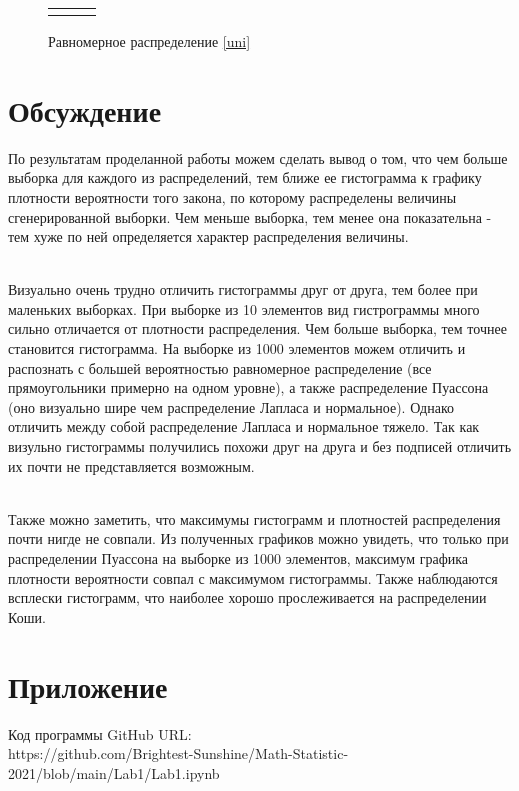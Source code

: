 \documentclass[a4paper]{article}
\begin{document}
	\begin{figure}[H]
		\centering
		\begin{tabular}{ccc}
			&
			&
		\end{tabular}
		\caption{Равномерное распределение \eqref{uni}}
		\label{fig:uniform}
	\end{figure}

\section{Обсуждение}

\noindent По результатам проделанной работы можем сделать вывод о том, что чем больше выборка для каждого из распределений, тем ближе ее гистограмма к графику плотности вероятности того закона, по которому распределены величины сгенерированной выборки. Чем меньше выборка, тем менее она показательна - тем хуже по ней определяется характер распределения величины.\\\

\noindent Визуально очень трудно отличить гистограммы друг от друга, тем более при маленьких выборках. При выборке из 10 элементов вид гистрограммы много сильно отличается от плотности распределения. Чем больше выборка, тем точнее становится гистограмма. На выборке из 1000 элементов можем отличить  и распознать с большей вероятностью равномерное распределение (все прямоугольники примерно на одном уровне), а также распределение Пуассона (оно визуально шире чем распределение Лапласа и нормальное). Однако отличить между собой распределение Лапласа и нормальное тяжело. Так как визульно гистограммы получились похожи друг на друга и без подписей отличить их почти не представляется возможным.\\\
 
\noindent Также можно заметить, что максимумы гистограмм и плотностей распределения почти нигде не совпали. Из полученных графиков можно увидеть, что только при распределении Пуассона на выборке из 1000 элементов, максимум графика плотности вероятности совпал с максимумом гистограммы. Также наблюдаются всплески гистограмм, что наиболее хорошо прослеживается на распределении Коши. 

\section{Приложение}

\noindent Код программы GitHub URL:\\
\newline https://github.com/Brightest-Sunshine/Math-Statistic-2021/blob/main/Lab1/Lab1.ipynb
\end{document}
